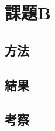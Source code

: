 %
%
\section{課題B}
\label{taskB}

%
%
\subsection{方法}
\label{taskB_method}

%
%
\subsection{結果}
\label{taskB_result}

%
%
\subsection{考察}
\label{taskB_consideration}

